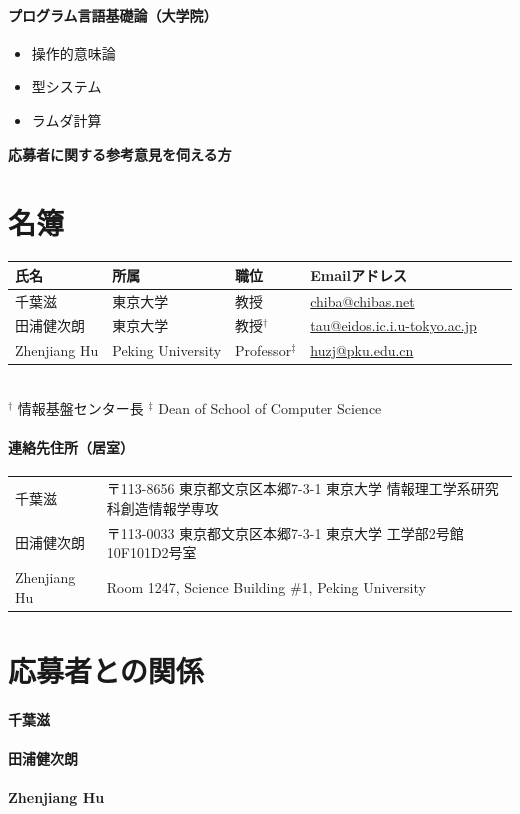 \documentclass[dvipdfmx]{jsarticle}
\begin{document}
\paragraph{プログラム言語基礎論（大学院）}
\begin{itemize}
 \item 操作的意味論
 \item 型システム
 \item ラムダ計算
\end{itemize}

\newpage
\begin{center}
\LARGE\bfseries 応募者に関する参考意見を伺える方
\end{center}
\bigskip

\section*{名簿}
\begin{center}
\begin{tabular}[t]{llllll}
氏名 & 所属 & 職位 & Emailアドレス \\ \hline
千葉滋 & 東京大学 & 教授 & \url{chiba@chibas.net}  \\
田浦健次朗 & 東京大学 & 教授$^\dagger$ & \url{tau@eidos.ic.i.u-tokyo.ac.jp} \\
Zhenjiang Hu & Peking University & Professor$^\ddagger$ & \url{huzj@pku.edu.cn} \\
\end{tabular}
\medskip\\
\noindent
$^\dagger$ 情報基盤センター長
\qquad
\noindent
$^\ddagger$ Dean of School of Computer Science
\end{center}
\paragraph{連絡先住所（居室）}
\begin{center}
\begin{tabular}[t]{ll}
千葉滋 & 〒113-8656 東京都文京区本郷7-3-1 東京大学 情報理工学系研究科創造情報学専攻 \\
田浦健次朗 & 〒113-0033 東京都文京区本郷7-3-1 東京大学 工学部2号館10F101D2号室 \\
Zhenjiang Hu & Room 1247, Science Building \#1, Peking University \\
\end{tabular}
\end{center}

\section*{応募者との関係}
\paragraph{千葉滋}

\paragraph{田浦健次朗}

\paragraph{Zhenjiang Hu}
\end{document}
